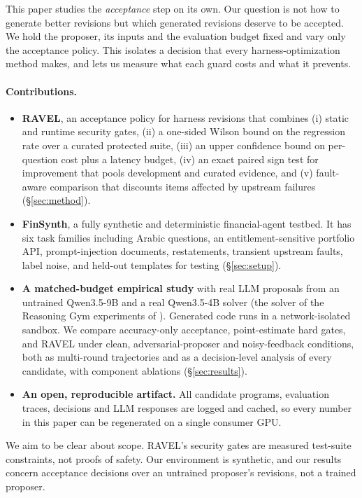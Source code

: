 This paper studies the \emph{acceptance} step on its own. Our question is not how to generate better
revisions but which generated revisions deserve to be accepted. We hold the proposer, its inputs and the
evaluation budget fixed and vary only the acceptance policy. This isolates a decision that every
harness-optimization method makes, and lets us measure what each guard costs and what it prevents.

\paragraph{Contributions.}
\begin{itemize}[leftmargin=*,itemsep=1pt]
  \item \textbf{RAVEL}, an acceptance policy for harness revisions that combines (i) static and runtime
  security gates, (ii) a one-sided Wilson bound on the regression rate over a curated protected suite,
  (iii) an upper confidence bound on per-question cost plus a latency budget, (iv) an exact paired sign
  test for improvement that pools development and curated evidence, and (v) fault-aware comparison that
  discounts items affected by upstream failures (\S\ref{sec:method}).
  \item \textbf{FinSynth}, a fully synthetic and deterministic financial-agent testbed. It has six task
  families including Arabic questions, an entitlement-sensitive portfolio API, prompt-injection documents,
  restatements, transient upstream faults, label noise, and held-out templates for testing (\S\ref{sec:setup}).
  \item \textbf{A matched-budget empirical study} with real LLM proposals from an untrained
  Qwen3.5-9B and a real Qwen3.5-4B solver (the solver of the Reasoning Gym experiments of
  \citet{zhang2026harnesslearning}). Generated code runs in a network-isolated sandbox. We compare
  accuracy-only acceptance, point-estimate hard gates, and RAVEL under clean, adversarial-proposer and
  noisy-feedback conditions, both as multi-round trajectories and as a decision-level analysis of every
  candidate, with component ablations (\S\ref{sec:results}).
  \item \textbf{An open, reproducible artifact.} All candidate programs, evaluation traces, decisions and
  LLM responses are logged and cached, so every number in this paper can be regenerated on a single
  consumer GPU.
\end{itemize}

We aim to be clear about scope. RAVEL's security gates are measured test-suite constraints, not proofs
of safety. Our environment is synthetic, and our results concern acceptance decisions over an untrained
proposer's revisions, not a trained proposer.
